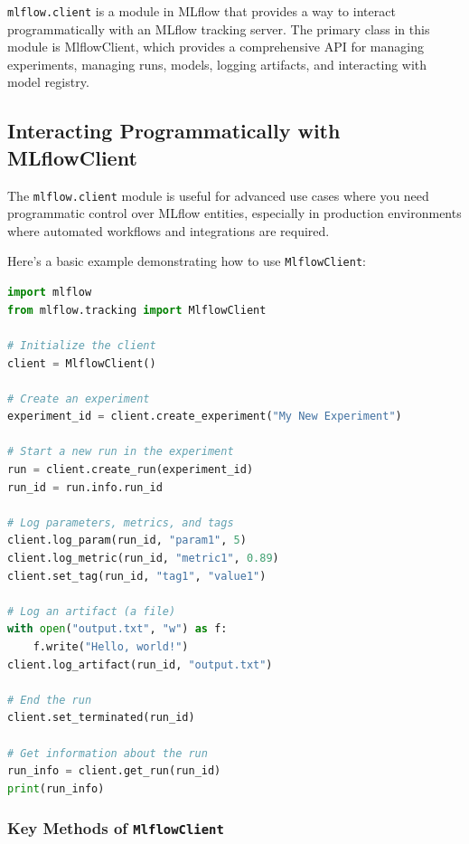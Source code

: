 \documentclass[letterpaper,12pt,notitlepage,twoside]{report}
\begin{document}
    \begin{mathaside}[frametitle=\mathtitle{Using \color{firebrick}{MLflowClient}}]
           \texttt{mlflow.client} is a module in MLflow that provides a way to interact programmatically with an MLflow tracking server. The primary class in this module is MlflowClient, which provides a comprehensive API for managing experiments, managing runs, models, logging artifacts, and interacting with model registry. 
    \end{mathaside}

\subsection{Interacting Programmatically with MLflowClient}
The \texttt{mlflow.client} module is useful for advanced use cases where you need programmatic control over MLflow entities, especially in production environments where automated workflows and integrations are required.

Here's a basic example demonstrating how to use \texttt{MlflowClient}:

\begin{lstlisting}[language=Python, caption=Example Usage of \texttt{MlflowClient}, label=code:example]
import mlflow
from mlflow.tracking import MlflowClient

# Initialize the client
client = MlflowClient()

# Create an experiment
experiment_id = client.create_experiment("My New Experiment")

# Start a new run in the experiment
run = client.create_run(experiment_id)
run_id = run.info.run_id

# Log parameters, metrics, and tags
client.log_param(run_id, "param1", 5)
client.log_metric(run_id, "metric1", 0.89)
client.set_tag(run_id, "tag1", "value1")

# Log an artifact (a file)
with open("output.txt", "w") as f:
    f.write("Hello, world!")
client.log_artifact(run_id, "output.txt")

# End the run
client.set_terminated(run_id)

# Get information about the run
run_info = client.get_run(run_id)
print(run_info)
\end{lstlisting}

\subsubsection{Key Methods of \texttt{MlflowClient}}
\end{document}
